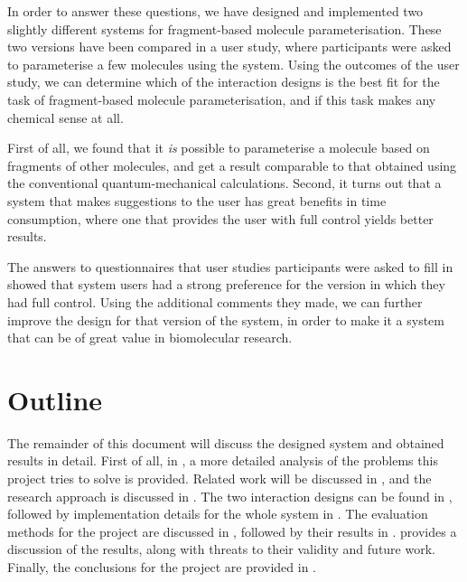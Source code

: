 In order to answer these questions, we have designed and implemented two slightly different systems for fragment-based molecule parameterisation. These two versions have been compared in a user study, where participants were asked to parameterise a few molecules using the system. Using the outcomes of the user study, we can determine which of the interaction designs is the best fit for the task of fragment-based molecule parameterisation, and if this task makes any chemical sense at all.

First of all, we found that it \emph{is} possible to parameterise a molecule based on fragments of other molecules, and get a result comparable to that obtained using the conventional quantum-mechanical calculations. Second, it turns out that a system that makes suggestions to the user has great benefits in time consumption, where one that provides the user with full control yields better results.

The answers to questionnaires that user studies participants were asked to fill in showed that system users had a strong preference for the version in which they had full control. Using the additional comments they made, we can further improve the design for that version of the system, in order to make it a system that can be of great value in biomolecular research.

\section{Outline}
The remainder of this document will discuss the designed system and obtained results in detail. First of all, in , a more detailed analysis of the problems this project tries to solve is provided. Related work will be discussed in , and the research approach is discussed in . The two interaction designs can be found in , followed by implementation details for the whole system in . The evaluation methods for the project are discussed in , followed by their results in .  provides a discussion of the results, along with threats to their validity and future work. Finally, the conclusions for the project are provided in .

